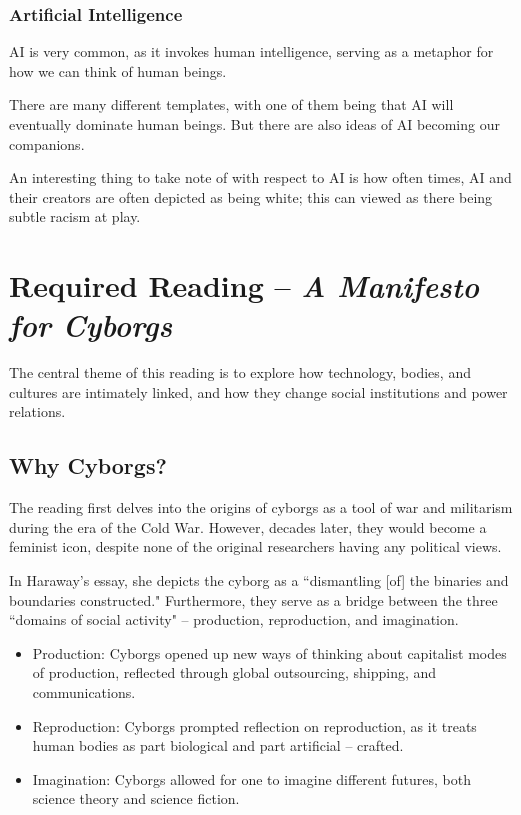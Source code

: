 \documentclass[openany]{book}
\begin{document}

\subsubsection{Artificial Intelligence}
AI is very common, as it invokes human intelligence, serving as a metaphor for how we can think of human beings.

There are many different templates, with one of them being that AI will eventually dominate human beings. But there are also ideas of AI becoming our companions.

An interesting thing to take note of with respect to AI is how often times, AI and their creators are often depicted as being white; this can viewed as there being subtle racism at play.

\section{Required Reading -- \textit{A Manifesto for Cyborgs}}
The central theme of this reading is to explore how technology, bodies, and cultures are intimately linked, and how they change social institutions and power relations.

\subsection{Why Cyborgs?}
The reading first delves into the origins of cyborgs as a tool of war and militarism during the era of the Cold War. However, decades later, they would become a feminist icon, despite none of the original researchers having any political views.

In Haraway's essay, she depicts the cyborg as a ``dismantling [of] the binaries and boundaries constructed." Furthermore, they serve as a bridge between the three ``domains of social activity" -- production, reproduction, and imagination.
\begin{itemize}
	\item Production: Cyborgs opened up new ways of thinking about capitalist modes of production, reflected through global outsourcing, shipping, and communications.
	\item Reproduction: Cyborgs prompted reflection on reproduction, as it treats human bodies as part biological and part artificial -- crafted.
	\item Imagination: Cyborgs allowed for one to imagine different futures, both science theory and science fiction.
\end{itemize}
\end{document}
